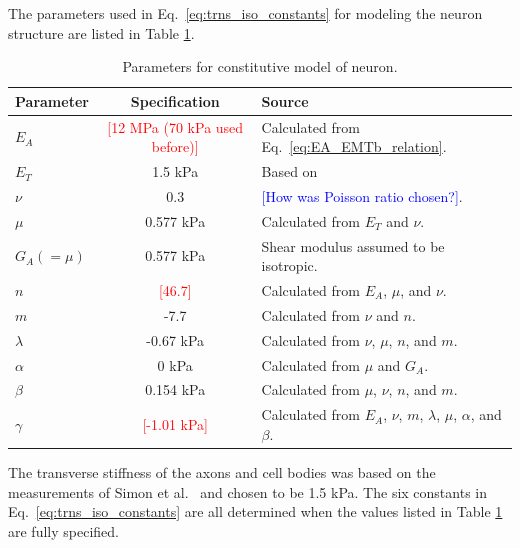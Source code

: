 \documentclass[]{interact}
\newcommand{\blue}[1]{\textcolor{blue}{[#1]}}
\newcommand{\red}[1]{\textcolor{red}{[#1]}}
\begin{document}
The parameters used in Eq.\ \eqref{eq:trns_iso_constants} for modeling the neuron structure are listed in Table \ref{table:neuron_parameters}. 
\begin{table}[ht]
\begin{center}
\begin{tabular}{ l c l }
\hline \hline
Parameter & Specification & Source\\
 \hline
$E_A $ & \red{12 MPa (70 kPa used before)} & Calculated from Eq.\ \eqref{eq:EA_EMTb_relation}. \\ 
$E_T $ & 1.5 kPa & Based on \cite{Simon:2016ig} \\
$\nu $ & 0.3 & \blue{How was Poisson ratio chosen?}. \\
$\mu $ & 0.577 kPa & Calculated from $E_T$ and $\nu$. \\ 
$G_A (= \mu) $ & 0.577 kPa & Shear modulus assumed to be isotropic.\\ 
\hline
$n $ & \red{46.7} & Calculated from $E_A$, $\mu$, and $\nu$. \\
$m $ & -7.7 & Calculated from $\nu$ and $n$. \\
$\lambda $ &  -0.67 kPa & Calculated from $\nu$, $\mu$, $n$, and $m$. \\
$\alpha $ & 0 kPa & Calculated from $\mu$ and $G_A$. \\
$\beta $ & 0.154 kPa & Calculated from $\mu$, $\nu$, $n$, and $m$. \\
$\gamma $ & \red{-1.01 kPa} & Calculated from $E_A$, $\nu$, $m$, $\lambda$, $\mu$, $\alpha$, and $\beta$.\\
\hline \hline
\end{tabular}
\end{center}
\caption{Parameters for constitutive model of neuron.}
\label{table:neuron_parameters}
\end{table}
%
The transverse stiffness of the axons and cell bodies was based on the measurements of Simon et al.\ \citep{Simon:2016ig} and chosen to be 1.5 kPa. The six constants in Eq.\ \eqref{eq:trns_iso_constants} are all determined when the values listed in Table \ref{table:neuron_parameters} are fully specified.
\end{document}
